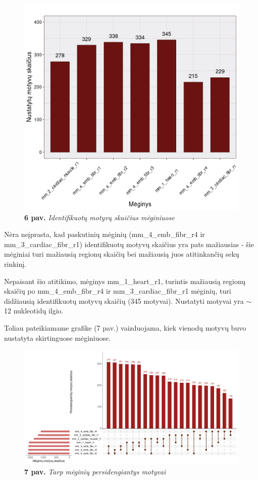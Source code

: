 \documentclass[12pt]{article}
\begin{document}
\begin{figure}[htb]
    \begin{center}
        \includegraphics[width=0.7\linewidth]{../Figures/motifs_in_samples.png}
        \caption*{\textbf{6 pav.} \emph{Identifikuotų motyvų skaičius mėginiuose}}
    \end{center}
\end{figure}

Nėra neįprasta, kad paskutinių mėginių (mm\_4\_emb\_fibr\_r4 ir
mm\_3\_cardiac\_fibr\_r1) identifikuotų motyvų skaičius yra pats
mažiausias - šie mėginiai turi mažiausią regionų skaičių bei 
mažiausią juos atitinkančių sekų rinkinį.

Nepaisant šio atitikimo, mėginys mm\_1\_heart\_r1, turintis
mažiausią regionų skaičių po mm\_4\_emb\_fibr\_r4 ir
mm\_3\_cardiac\_fibr\_r1 mėginių, turi didžiausią identifikuotų
motyvų skaičių (345 motyvai). Nustatyti motyvai yra \(\sim\)12
nukleotidų ilgio.

Toliau pateikiamame grafike (7 pav.) vaizduojama, kiek vienodų
motyvų buvo nustatyta skirtinguose mėginiuose.

\newpage

\begin{figure}[htb]
    \begin{center}
        \includegraphics[width=1\linewidth]{../Figures/motif_intersections.png}
        \caption*{\textbf{7 pav.} \emph{Tarp mėginių persidengiantys motyvai}}
    \end{center}
\end{figure}
\end{document}
